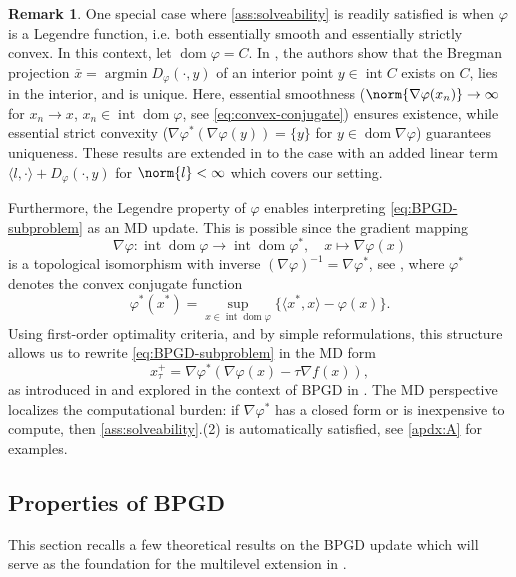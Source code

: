 \documentclass[11pt,reqno]{amsart}
\numberwithin{equation}{section}
\numberwithin{figure}{section}
\theoremstyle{plain}
\theoremstyle{definition}
\newtheorem{remark}[theorem]{Remark}
\newcommand{\la}{\langle}
\newcommand{\ra}{\rangle}
\newcommand{\vphi}{\varphi}
\newcommand{\dvphi}{\nabla \vphi}
\newcommand{\df}{\nabla f}
\DeclareMathOperator{\dom}{dom}
\DeclareMathOperator{\intr}{int}
\DeclareMathOperator*{\argmin}{arg min}
\begin{document}
\begin{remark} \label{rm:MD-special-setting}
    One special case where \cref{ass:solveability} is readily satisfied is when $\vphi$ is a Legendre function, i.e. both essentially smooth and essentially strictly convex. In this context, let $\dom \vphi = C$. In \cite[Thm 3.12]{Bauschke:1997aa}, the authors show that the Bregman projection $\bar x = \argmin D_\vphi(\cdot,y)$ of an interior point $y \in \intr C$ exists on $C$, lies in the interior, and is unique.
    Here, essential smoothness ($\norm{\dvphi(x_n)} \to \infty$ for $x_n \to x$, $x_n \in \intr \dom \vphi$, see \eqref{eq:convex-conjugate}) ensures existence, while essential strict convexity ($\dvphi^\ast(\dvphi(y)) = \{y\}$ for $y \in \dom \dvphi$) guarantees uniqueness. These results are extended in \cite{Petra2013a} to the case with an added linear term $\la l, \cdot \ra + D_\vphi(\cdot,y)$ for $\norm{l} < \infty$ which covers our setting.

    Furthermore, the Legendre property of $\vphi$ enables interpreting \eqref{eq:BPGD-subproblem} as an MD update. This is possible since the gradient mapping
    \begin{equation} \label{eq:convex-conjugate}
        \dvphi: \intr \dom \vphi \to \intr \dom \vphi^*, \quad x \mapsto \dvphi(x)
    \end{equation}
    is a topological isomorphism with inverse $(\dvphi)^{-1} = \dvphi^*$, see \cite[Theorem 26.5]{Rockafellar:1997}, where $\vphi^\ast$ denotes the convex conjugate function
    \begin{equation}
        \vphi^\ast(x^\ast) = \sup_{x \in \intr \dom \vphi} \{\la x^\ast, x \ra - \vphi(x) \}.
    \end{equation}
    Using first-order optimality criteria, and by simple reformulations, this structure allows us to rewrite \eqref{eq:BPGD-subproblem} in the MD form
    \begin{equation} \label{eq:MD}
         x^{+}_\tau = \dvphi^*(\dvphi(x)-\tau \df(x)),
    \end{equation}
    as introduced in \cite{Nemirovski1983} and explored in the context of BPGD in \cite{Beck:2003aa}. 
    The MD perspective localizes the computational burden: if $\dvphi^\ast$ has a closed form or is inexpensive to compute, then \cref{ass:solveability}.(2) is automatically satisfied, see \cref{apdx:A} for examples. 
\end{remark}
%
\subsection{Properties of BPGD} This section recalls a few theoretical results on the BPGD update which will serve as the foundation for the multilevel extension in .
\end{document}

